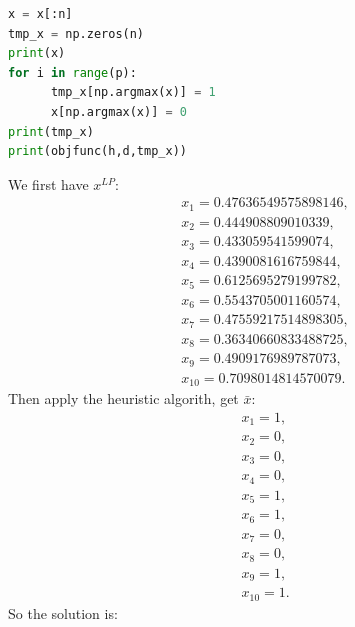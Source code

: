 \documentclass[12pt]{article}
\begin{document}
\begin{enumerate}
\begin{enumerate}
\begin{lstlisting}[language=Python]
x = x[:n]
tmp_x = np.zeros(n)
print(x)
for i in range(p):
      tmp_x[np.argmax(x)] = 1
      x[np.argmax(x)] = 0
print(tmp_x)
print(objfunc(h,d,tmp_x))
                        \end{lstlisting}
                        We first have $x^{LP}$:
                        \begin{align*}
                               & x_{1} = 0.47636549575898146, \\
                               & x_{2} = 0.444908809010339,   \\
                               & x_{3} = 0.433059541599074,   \\
                               & x_{4} = 0.4390081616759844,  \\
                               & x_{5} = 0.6125695279199782,  \\
                               & x_{6} = 0.5543705001160574,  \\
                               & x_{7} = 0.47559217514898305, \\
                               & x_{8} = 0.36340660833488725, \\
                               & x_{9} = 0.4909176989787073,  \\
                               & x_{10} = 0.7098014814570079.
                        \end{align*}
                        Then apply the heuristic algorith, get
                        $\bar{x}$:
                        \begin{align*}
                               & x_1 = 1,    \\
                               & x_2 = 0,    \\
                               & x_3 = 0,    \\
                               & x_4 = 0,    \\
                               & x_5 = 1,    \\
                               & x_6 = 1,    \\
                               & x_7 = 0,    \\
                               & x_8 = 0,    \\
                               & x_9 = 1,    \\
                               & x_{10} = 1.
                        \end{align*}
                        So the solution is:
                        \begin{align*}

\end{align*}
\end{enumerate}
\end{enumerate}
\end{document}
